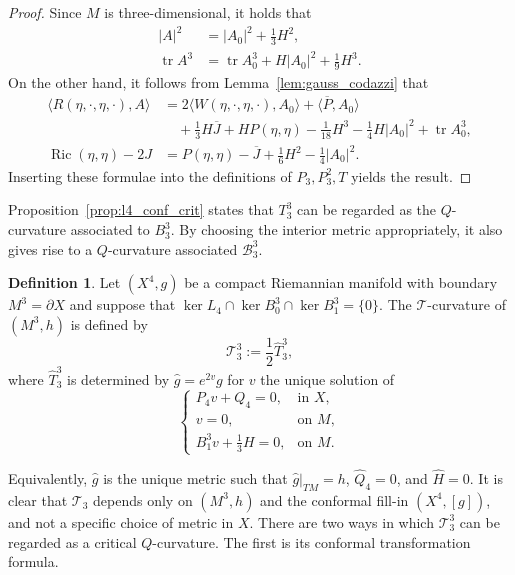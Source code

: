 \documentclass{amsart}
\theoremstyle{definition}
\newtheorem{defn}[thm]{Definition}
\theoremstyle{remark}
\numberwithin{equation}{section}
\begin{document}
\begin{proof}
 Since $M$ is three-dimensional, it holds that
 \begin{align*}
  {\lvert} A{\rvert}^2 & = {\lvert} A_0{\rvert}^2 + \frac{1}{3}H^2 , \\
  \operatorname{tr} A^3 & = \operatorname{tr} A_0^3 + H{\lvert} A_0{\rvert}^2 + \frac{1}{9}H^3 . 
 \end{align*}
 On the other hand, it follows from Lemma~\ref{lem:gauss_codazzi} that
 \begin{align*}
  {\langle} R(\eta,\cdot,\eta,\cdot), A {\rangle} & = 2{\langle} W(\eta,\cdot,\eta,\cdot), A_0{\rangle} + {\langle}{\overline{P}},A_0{\rangle} \\
   & \quad + \frac{1}{3}H{\overline{J}} + HP(\eta,\eta) - \frac{1}{18}H^3 - \frac{1}{4}H{\lvert} A_0{\rvert}^2 + \operatorname{tr} A_0^3, \\
  \operatorname{Ric}(\eta,\eta) - 2J & = P(\eta,\eta) - {\overline{J}} + \frac{1}{6}H^2 - \frac{1}{4}{\lvert} A_0{\rvert}^2 .
 \end{align*}
 Inserting these formulae into the definitions of $P_3,P_3^2,T$ yields the result.
\end{proof}

Proposition~\ref{prop:l4_conf_crit} states that $T_3^3$ can be regarded as the $Q$-curvature associated to $B_3^3$.  By choosing the interior metric appropriately, it also gives rise to a $Q$-curvature associated ${\mathcal{B}}_3^3$.

\begin{defn}
 Let $(X^4,g)$ be a compact Riemannian manifold with boundary $M^3=\partial X$ and suppose that $\ker L_4\cap\ker B_0^3\cap\ker B_1^3=\{0\}$.  The ${\mathcal{T}}$-curvature of $(M^3,h)$ is defined by
 \[ {\mathcal{T}}_3^3 := \frac{1}{2}{\widehat{T}}_3^3, \]
 where ${\widehat{T}}_3^3$ is determined by ${\widehat{g}}=e^{2v}g$ for $v$ the unique solution of
 \begin{equation}
  \label{eqn:mT_ext}
  \begin{cases}
   P_4v + Q_4 = 0, & \text{in $X$}, \\
   v = 0, & \text{on $M$}, \\
   B_1^3v+\frac{1}{3}H=0, & \text{on $M$} .
  \end{cases}
 \end{equation}
\end{defn}

Equivalently, ${\widehat{g}}$ is the unique metric such that ${\widehat{g}}{\rvert}_{TM}=h$, ${\widehat{Q}}_4=0$, and ${\widehat{H}}=0$.  It is clear that ${\mathcal{T}}_3$ depends only on $(M^3,h)$ and the conformal fill-in $(X^4,[g])$, and not a specific choice of metric in $X$.  There are two ways in which ${\mathcal{T}}_3^3$ can be regarded as a critical $Q$-curvature.  The first is its conformal transformation formula.
\end{document}
